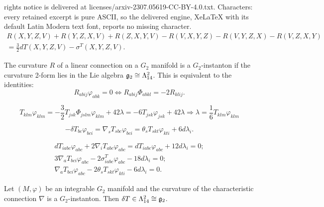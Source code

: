 \documentclass[10pt,a4paper]{amsart}
\def\p{{\varphi}}
\def\ph{{\Phi}}
\def\sb {{\nabla}}
\begin{document}
rights notice is delivered at licenses/arxiv-2307.05619-CC-BY-4.0.txt. Characters: every retained excerpt is pure ASCII, so the delivered engine, XeLaTeX with its default Latin Modern text font, reports no missing character.
 \begin{equation}\label{gen}
 \begin{split}
 R(X,Y,Z,V)+ R(Y,Z,X,V)+ R(Z,X,Y,V)-R(V,X,Y,Z)-R(V,Y,Z,X)-R(V,Z,X,Y)\\
 =\frac32dT(X,Y,Z,V)-\sigma^T(X,Y,Z,V).
 \end{split}
 \end{equation}

\begin{dfn}
The curvature $R$ of a linear connection on a $G_2$ manifold  is a $G_2$-instanton if  the curvature 2-form lies in the Lie algebra $\frak{g}_2\cong\Lambda^2_{14}$. This is equivalent to  the  identities:
\begin{equation}\label{rri}
R_{abij}\p_{abk}=0 \Longleftrightarrow R_{abij}\ph_{abkl}=-2R_{klij}.
\end{equation}
\end{dfn}

\begin{equation}\label{lmt}
T_{klm}\p_{klm}=-\frac32T_{jsk}\Phi_{jslm}\p_{klm}+42\lambda=-6T_{jsk}\p_{jsk}+42\lambda \Longrightarrow \lambda=\frac16T_{klm}\p_{klm}
\end{equation}

\begin{equation}\label{nnew1}
 -\delta T_{bc}\p_{bci}=\sb_sT_{sbc}\p_{bci}=\theta_sT_{skt}\p_{kti}+6d\lambda_i.
\end{equation}

\begin{equation}\label{dtt}
\begin{split}
dT_{iabc}\p_{abc}+2\sb_iT_{abc}\p_{abc}=
dT_{iabc}\p_{abc}+12d\lambda_i=0;\\
 3\sb_aT_{bci}\p_{abc}-2\sigma^T_{iabc}\p_{abc}-18d\lambda_i=0;\\
\sb_aT_{bci}\p_{abc}-2\theta_sT_{skt}\p_{kti}-6d\lambda_i=0.
\end{split}
\end{equation}

\begin{lemma}
Let $(M,\p)$ be  an integrable $G_2$ manifold and the  curvature of the characteristic  connection $\sb$   is a $G_2$-instanton. Then  $\delta T\in\Lambda^2_{14}\cong  \frak{g}_2$.%
\end{lemma}
\end{document}
